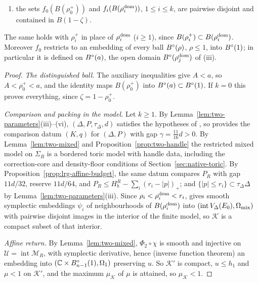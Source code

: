 \begin{theorem}
\begin{enumerate}[label=(\roman*)]
 for $i\ge1$;
\item the sets $f_0(B(\rho_0^+))$ and $f_i(B(\rho_i^{\rm dom}))$, $1\le i\le k$, are pairwise disjoint and contained in $B(1-\zeta)$.
\end{enumerate}
The same holds with $\rho_i^+$ in place of $\rho_i^{\rm dom}$ ($i\ge1$), since $B(\rho_i^+)\subset B(\rho_i^{\rm dom})$. Moreover $f_0$
restricts to an embedding of every ball $B^{\circ}(\rho)$, $\rho\le1$, into $B^{\circ}(1)$; in particular it is defined on
$B^{\circ}(a)$, the open domain $B^{\circ}(\rho_j^{\rm dom})$ of (iii).
\end{theorem}

\begin{proof}
\emph{The distinguished ball.} The auxiliary inequalities give $A<a$, so $A<\rho_0^+<a$, and the identity maps
$B(\rho_0^+)$ into $B^{\circ}(a)\subset B^{\circ}(1)$. If $k=0$ this proves everything, since $\zeta=1-\rho_0^+$.

\emph{Comparison and packing in the model.} Let $k\ge1$. By Lemma~\ref{lem:two-parameters}(iii)--(vi), $(\Delta,P,\tau_\Delta,d)$
satisfies the hypotheses of , so  provides the comparison datum
$(K,q)$ for $(\Delta,P)$ with gap $\gamma=\frac{11}{16}d>0$. By Lemma~\ref{lem:two-mixed} and Proposition~\ref{prop:two-handle} the
restricted mixed model on $\Sigma_R$ is a bordered toric model with handle data, including the correction-core and
density-floor conditions of Section~\ref{sec:native-toric}. By Proposition~\ref{prop:lrg-affine-budget}, the same datum
compares $P_R$ with gap $11d/32$, reserve $11d/64$, and $P_R\le H_b^R-\sum_i(r_i-|p|)_+$; and
$\{|p|\le r_i\}\subset\tau_\Delta\Delta$ by Lemma~\ref{lem:two-parameters}(iii). Since $\rho_i<\rho_i^{\rm dom}<r_i$,
 gives smooth symplectic embeddings $\psi_i$ of neighbourhoods of $B(\rho_i^{\rm dom})$
into $(\operatorname{int}V_\Delta(E_0),\Omega_{\rm mix})$ with pairwise disjoint images in the interior of the finite
model, so $\mathcal K$ is a compact subset of that interior.

\emph{Affine return.} By Lemma~\ref{lem:two-mixed}, $\Phi_2\circ\chi$ is smooth and injective on $\mathcal U=\operatorname{int}\mathcal M_R$,
with symplectic derivative, hence (inverse function theorem) an embedding into $(\mathbb{C}\times B^{\circ}_{n-1}(1),\Omega_1)$
preserving $u$. So $\mathcal K'$ is compact, $u\le h_1$ and $\mu<1$ on $\mathcal K'$, and the maximum $\mu_{\mathcal K}$
of $\mu$ is attained, so $\mu_{\mathcal K}<1$.


\end{proof}
